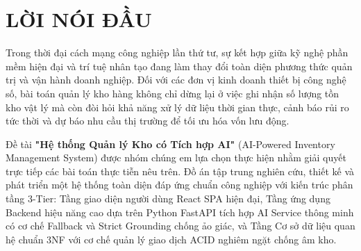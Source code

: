 \chapter*{LỜI NÓI ĐẦU}

Trong thời đại cách mạng công nghiệp lần thứ tư, sự kết hợp giữa kỹ nghệ phần mềm hiện đại và trí tuệ nhân tạo đang làm thay đổi toàn diện phương thức quản trị và vận hành doanh nghiệp. Đối với các đơn vị kinh doanh thiết bị công nghệ số, bài toán quản lý kho hàng không chỉ dừng lại ở việc ghi nhận số lượng tồn kho vật lý mà còn đòi hỏi khả năng xử lý dữ liệu thời gian thực, cảnh báo rủi ro tức thời và dự báo nhu cầu thị trường để tối ưu hóa vốn lưu động.

Đề tài \textbf{"Hệ thống Quản lý Kho có Tích hợp AI"} (AI-Powered Inventory Management System) được nhóm chúng em lựa chọn thực hiện nhằm giải quyết trực tiếp các bài toán thực tiễn nêu trên. Đồ án tập trung nghiên cứu, thiết kế và phát triển một hệ thống toàn diện đáp ứng chuẩn công nghiệp với kiến trúc phân tầng 3-Tier: Tầng giao diện người dùng React SPA hiện đại, Tầng ứng dụng Backend hiệu năng cao dựa trên Python FastAPI tích hợp AI Service thông minh có cơ chế Fallback và Strict Grounding chống ảo giác, và Tầng Cơ sở dữ liệu quan hệ chuẩn 3NF với cơ chế quản lý giao dịch ACID nghiêm ngặt chống âm kho.
